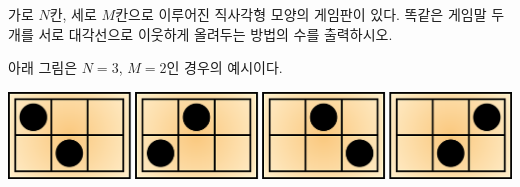 가로 $N$칸, 세로 $M$칸으로 이루어진 직사각형 모양의 게임판이 있다. 똑같은 게임말 두 개를 서로 대각선으로 이웃하게 올려두는 방법의 수를 출력하시오.

아래 그림은 $N = 3$, $M = 2$인 경우의 예시이다.
\begin{center}
\includegraphics{grid.png}
\end{center}